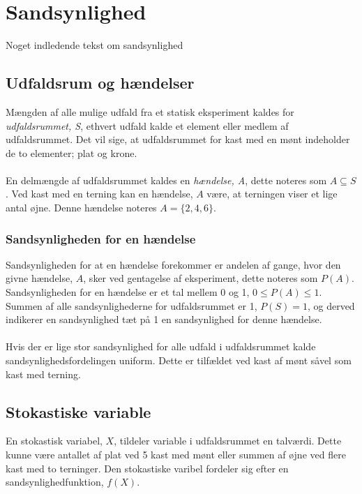 \section{Sandsynlighed}
Noget indledende tekst om sandsynlighed

\subsection{Udfaldsrum og hændelser}
Mængden af alle mulige udfald fra et statisk eksperiment kaldes for \emph{udfaldsrummet,  S}, ethvert udfald kalde et element eller medlem af udfaldsrummet. Det vil sige, at udfaldsrummet for kast med en mønt indeholder de to elementer; plat og krone.
\\
\\
\noindent En delmængde af udfaldsrummet kaldes en \emph{hændelse, A}, dette noteres som $A \subseteq S$. Ved kast med en terning kan en hændelse, $A$ være, at terningen viser et lige antal øjne. Denne hændelse noteres $A=\{2,4,6\}$.


\subsubsection{Sandsynligheden for en hændelse}
Sandsynligheden for at en hændelse forekommer er andelen af gange, hvor den givne hændelse, $A$, sker ved gentagelse af eksperiment, dette noteres som $P(A)$. Sandsynligheden for en hændelse er et tal mellem 0 og 1, $0 \le P(A) \le 1$. 
Summen af alle sandsynlighederne for udfaldsrummet er 1, $P(S)=1$, og derved indikerer en sandsynlighed tæt på 1 en sandsynlighed for denne hændelse.
\\
\\
\noindent Hvis der er lige stor sandsynlighed for alle udfald i udfaldsrummet kalde sandsynlighedsfordelingen uniform. Dette er tilfældet ved kast af mønt såvel som kast med terning.


\subsection{Stokastiske variable}
En stokastisk variabel, $X$, tildeler variable i udfaldsrummet en talværdi. Dette kunne være antallet af plat ved 5 kast med mønt eller summen af øjne ved flere kast med to terninger. Den stokastiske varibel fordeler sig efter en sandsynlighedfunktion, $f(X)$.

